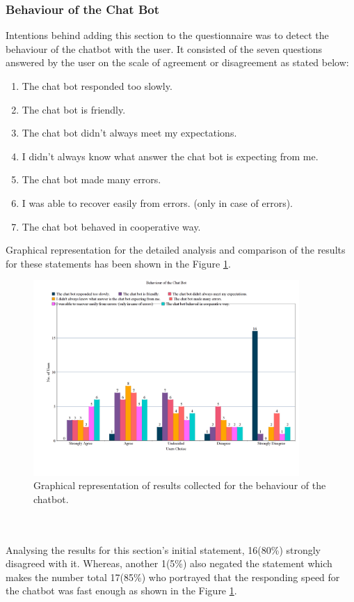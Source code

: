 
\subsubsection*{Behaviour of the Chat Bot}
Intentions behind adding this section to the questionnaire was to detect the behaviour of the chatbot with the user. It consisted of the seven questions answered by the user on the scale of agreement or disagreement as stated below: 
\begin{enumerate}
    \item The chat bot responded too slowly.
    \item The chat bot is friendly.
    \item The chat bot didn't always meet my expectations.
    \item I didn't always know what answer the chat bot is expecting from me.
    \item The chat bot made many errors.
    \item I was able to recover easily from errors. (only in case of errors).
    \item The chat bot behaved in cooperative way.
\end{enumerate}
Graphical representation for the detailed analysis and comparison of the results for these statements has been shown in the Figure \ref{fig:behavofBot}.

\begin{figure}[!h]
    \centering
    \includegraphics[width=0.9\textwidth]{img/Behaviour_of_the_Chat_Bot.png}
    \caption{Graphical representation of results collected for the behaviour of the chatbot.}
    \label{fig:behavofBot}
\end{figure}
\\~\\
Analysing the results for this section's initial statement, 16(80\%) strongly disagreed with it. Whereas, another 1(5\%) also negated the statement which makes the number total 17(85\%) who portrayed that the responding speed for the chatbot was fast enough as shown in the Figure \ref{fig:behavofBot}. 

